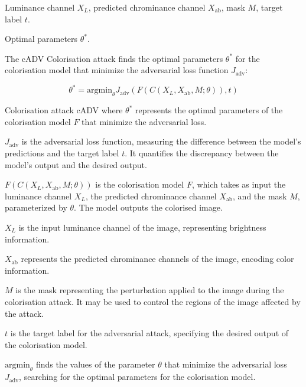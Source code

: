 Luminance channel $X_L$, predicted chrominance channel $X_{\text{ab}}$, mask $M$, target label $t$.

Optimal parameters $\theta^*$.

The cADV Colorisation attack finds the optimal parameters $\theta^*$ for the colorisation model that minimize the adversarial loss function $J_{\text{adv}}$:

\[
\theta^* = \text{argmin}_\theta J_{\text{adv}} \left(F \left(C(X_L, X_{\text{ab}}, M; \theta)\right), t \right)
\]

Colorisation attack cADV where $\theta^*$ represents the optimal parameters of the colorisation model $F$ that minimize the adversarial loss.

$J_{\text{adv}}$ is the adversarial loss function, measuring the difference between the model's predictions and the target label $t$. It quantifies the discrepancy between the model's output and the desired output.

$F(C(X_L, X_{\text{ab}}, M; \theta))$ is the colorisation model $F$, which takes as input the luminance channel $X_L$, the predicted chrominance channel $X_{\text{ab}}$, and the mask $M$, parameterized by $\theta$. The model outputs the colorised image.

$X_L$ is the input luminance channel of the image, representing brightness information.

$X_{\text{ab}}$ represents the predicted chrominance channels of the image, encoding color information.

$M$ is the mask representing the perturbation applied to the image during the colorisation attack. It may be used to control the regions of the image affected by the attack.

$t$ is the target label for the adversarial attack, specifying the desired output of the colorisation model.

$\text{argmin}_\theta$ finds the values of the parameter $\theta$ that minimize the adversarial loss $J_{\text{adv}}$, searching for the optimal parameters for the colorisation model.
